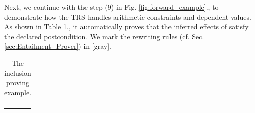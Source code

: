 \documentclass[acmsmall,10pt,review]{acmart}
\newcommand{\effect}{\textcolor{black}{\ensuremath{\mathrm{\Phi}}}}
\newcommand{\anyevent}[1]{{\textcolor{darkred}
{{\textbf{\footnotesize #1}}}}}
\newcommand{\code}[1]{{\tt{\ensuremath{\m{#1}}}}}
\newcommand{\m}{\mathit}
\newcommand\figref[1]{Fig. \textcolor{black}{\ref{#1}}.}
\newcommand\tabref[1]{Table \textcolor{black}{\ref{#1}}.}
\newcommand\secref[1]{Sec. \textcolor{black}{\ref{#1}}}
\begin{document}
{%



Next, we continue with the step (9) in \figref{fig:forward_example}, to 
demonstrate how the TRS handles arithmetic constraints and dependent values. 
As shown in \tabref{tab:rewriting_tree_send}, it automatically proves that the inferred effects of {}
 satisfy the declared postcondition. 
We mark the rewriting rules (cf. \secref{sec:Entailment_Prover}) in \textcolor{mGray}{[gray]}.

{
\begin{table}[ht]
\centering
      \vspace{0mm}
\caption{\label{tab:rewriting_tree_send} The inclusion proving example. }
      
\vspace{-1mm}
\begin{adjustbox}{width=1\textwidth}
 \Large\begin{tabular}[t]{l}
  \hline\\
{

}
\end{tabular}
\end{adjustbox}
\end{table}}}
\end{document}
